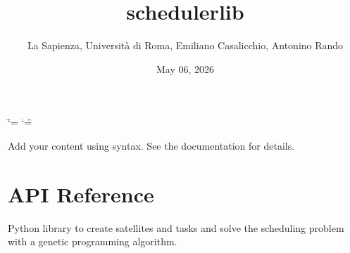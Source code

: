 \documentclass[letterpaper,10pt,english]{sphinxmanual}
\title{schedulerlib}
\date{May 06, 2026}
\author{La Sapienza, Università di Roma, Emiliano Casalicchio, Antonino Rando}
\begin{document}
\ifdefined\shorthandoff
  \ifnum\catcode`\=\string=\active\shorthandoff{=}\fi
  \ifnum\catcode`\"=\active{}\fi
\fi

\pagestyle{empty}
\sphinxmaketitle
\pagestyle{plain}
\sphinxtableofcontents
\pagestyle{normal}
\label{\detokenize{index::doc}}


\sphinxAtStartPar
Add your content using  syntax. See the
documentation for details.

\sphinxstepscope


\chapter{API Reference}
\label{\detokenize{api:module-scheduler}}\label{\detokenize{api:api-reference}}\label{\detokenize{api::doc}}
\sphinxAtStartPar
Python library to create satellites and tasks and solve the scheduling problem with a genetic programming algorithm.
\end{document}
